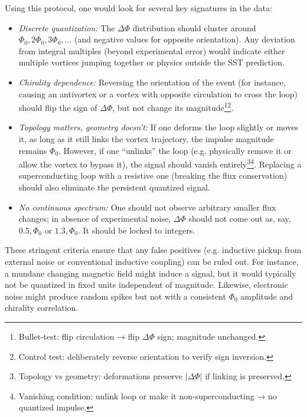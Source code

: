 \documentclass[12pt]{article}
\begin{document}
Using this protocol, one would look for several key signatures in the data:

\begin{itemize}

\item \emph{Discrete quantization:} The $\Delta\Phi$ distribution should cluster around $\Phi_{0}, 2\Phi_{0}, 3\Phi_{0},\dots$ (and negative values for opposite orientation). Any deviation from integral multiples (beyond experimental error) would indicate either multiple vortices jumping together or physics outside the SST prediction.

\item \emph{Chirality dependence:} Reversing the orientation of the event (for instance, causing an antivortex or a vortex with opposite circulation to cross the loop) should flip the sign of $\Delta\Phi$, but not change its magnitude\footnote{Bullet-test: flip circulation → flip $\Delta\Phi$ sign; magnitude unchanged.}\footnote{Control test: deliberately reverse orientation to verify sign inversion.}.

\item \emph{Topology matters, geometry doesn't:} If one deforms the loop slightly or moves it, as long as it still links the vortex trajectory, the impulse magnitude remains $\Phi_{0}$. However, if one ``unlinks'' the loop (e.g. physically remove it or allow the vortex to bypass it), the signal should vanish entirely\footnote{Topology vs geometry: deformations preserve $|\Delta\Phi|$ if linking is preserved.}\footnote{Vanishing condition: unlink loop or make it non-superconducting → no quantized impulse.}. Replacing a superconducting loop with a resistive one (breaking the flux conservation) should also eliminate the persistent quantized signal.

\item \emph{No continuous spectrum:} One should not observe arbitrary smaller flux changes; in absence of experimental noise, $\Delta\Phi$ should not come out as, say, $0.5,\Phi_{0}$ or $1.3,\Phi_{0}$. It should be locked to integers.

\end{itemize}




These stringent criteria ensure that any false positives (e.g. inductive pickup from external noise or conventional inductive coupling) can be ruled out. For instance, a mundane changing magnetic field might induce a signal, but it would typically not be quantized in fixed units independent of magnitude. Likewise, electronic noise might produce random spikes but not with a consistent $\Phi_{0}$ amplitude and chirality correlation.
\end{document}
